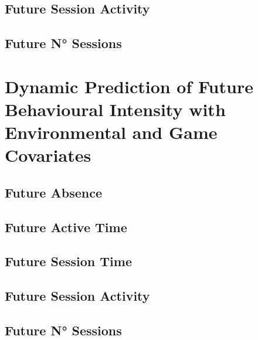 \subsection{Future Session Activity}
\label{future_acti_bayes_2}

\subsection{Future N° Sessions}
\label{future_abs_bayes_2}

\section{Dynamic Prediction of Future Behavioural Intensity with Environmental and Game Covariates}
\label{dynamic_env_even_prediction_ancillary_perf}

\subsection{Future Absence}
\label{future_abs_bayes_2}

\subsection{Future Active Time}
\label{future_abs_bayes_2}

\subsection{Future Session Time}
\label{future_abs_bayes_2}

\subsection{Future Session Activity}
\label{future_abs_bayes_2}

\subsection{Future N° Sessions}
\label{future_abs_bayes_2}
